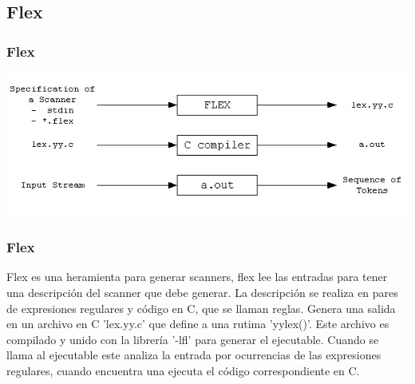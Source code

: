\documentclass{beamer}
\begin{document}
\subsection{Flex}\begin{frame} 
\frametitle{Flex} 
 
\includegraphics[width=\textwidth]{flex}\end{frame} 
\begin{frame}[allowframebreaks] 
\frametitle{Flex} 
 
Flex es una heramienta para generar scanners, flex lee las entradas para tener una descripción del scanner que debe generar. La descripción se realiza en pares de expresiones regulares y código en C, que se llaman reglas. Genera una salida en un archivo en C 'lex.yy.c' que define a una rutima 'yylex()'. Este archivo es compilado y unido con la librería '-lfl' para generar el ejecutable. Cuando se llama al ejecutable este analiza la entrada por ocurrencias de las expresiones regulares, cuando encuentra una ejecuta el código correspondiente en C.\end{frame} 
\end{document}
